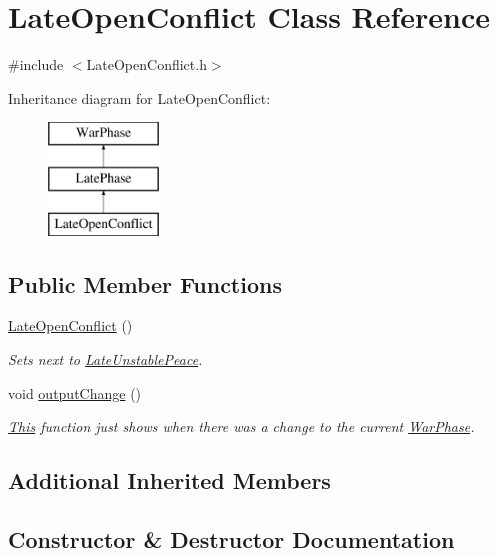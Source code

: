 \hypertarget{class_late_open_conflict}{}\section{Late\+Open\+Conflict Class Reference}
\label{class_late_open_conflict}


{\ttfamily \#include $<$Late\+Open\+Conflict.\+h$>$}

Inheritance diagram for Late\+Open\+Conflict\+:\begin{figure}[H]
\begin{center}
\leavevmode
\includegraphics[height=3.000000cm]{class_late_open_conflict}
\end{center}
\end{figure}
\subsection*{Public Member Functions}
\begin{DoxyCompactItemize}
\item 
\mbox{\hyperlink{class_late_open_conflict_a9c83c7d30169b2e2a6c59585c8fb482b}{Late\+Open\+Conflict}} ()
\begin{DoxyCompactList}\small\item\em Sets next to \mbox{\hyperlink{class_late_unstable_peace}{Late\+Unstable\+Peace}}. \end{DoxyCompactList}\item 
void \mbox{\hyperlink{class_late_open_conflict_a12323179f9dda8bc9bd278bef208b698}{output\+Change}} ()
\begin{DoxyCompactList}\small\item\em \mbox{\hyperlink{class_this}{This}} function just shows when there was a change to the current \mbox{\hyperlink{class_war_phase}{War\+Phase}}. \end{DoxyCompactList}\end{DoxyCompactItemize}
\subsection*{Additional Inherited Members}


\subsection{Constructor \& Destructor Documentation}
\mbox{\label{class_late_open_conflict_a9c83c7d30169b2e2a6c59585c8fb482b}} 
